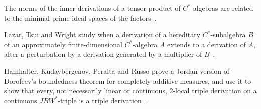 The norms of the inner derivations of a tensor product of $C^*$-algebras are related to the minimal prime ideal spaces of the factors~\cite{WlMinimalPrimeIdealSpacesAndNorm1996}.

Lazar, Tsui and Wright study when a derivation of a hereditary $C^*$-subalgebra $B$ of an approximately finite-dimensional $C^*$-algebra $A$ extends to a derivation of $A$, after a perturbation by a derivation generated by a multiplier of $B$~\cite{WlExtendingDerivationsFromHeredi1998}.

Hamhalter, Kudaybergenov, Peralta and Russo prove a Jordan version of Dorofeev's boundedness theorem for completely additive measures, and use it to show that every, not necessarily linear or continuous, 2-local triple derivation on a continuous $JBW^*$-triple is a triple derivation~\cite{WlBoundednessOfCompletelyAdditiv2015}.
